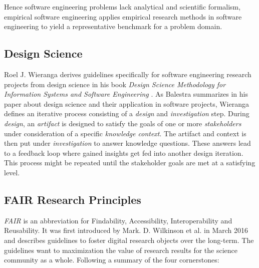\documentclass[12pt,a4paper]{article}
\begin{document}
Hence software engineering problems lack analytical and scientific formalism, empirical software engineering applies empirical research methods in software engineering to yield a representative benchmark for a problem domain.

\subsection{Design Science}

Roel J. Wieranga derives guidelines specifically for software engineering research projects from design science in his book \emph{Design Science Methodology for Information Systems and Software Engineering} \cite{wieringa}. As Balestra \cite{balestra:2019:designscience:articactandcontext} summarizes in his paper about design science and their application in software projects, Wieranga \cite{wieringa} defines an iterative process consisting of a \emph{design} and \emph{investigation} step. During \emph{design}, an \emph{artifact} is designed to satisfy the goals of one or more \emph{stakeholders} under consideration of a specific \emph{knowledge context}. The artifact and context is then put under \emph{investigation} to answer knowledge questions. These answers lead to a feedback loop where gained insights get fed into another design iteration. This process might be repeated until the stakeholder goals are met at a satisfying level.

\subsection{FAIR Research Principles}
\emph{FAIR} is an abbreviation for Findability, Accessibility, Interoperability and Reusability. It was first introduced by Mark. D. Wilkinson et al. in March 2016 \cite{wilkinson:2016} and describes guidelines to foster digital research objects over the long-term. The guidelines want to maximization the value of research results for the science community as a whole. Following a summary of the four cornerstones:
\end{document}
